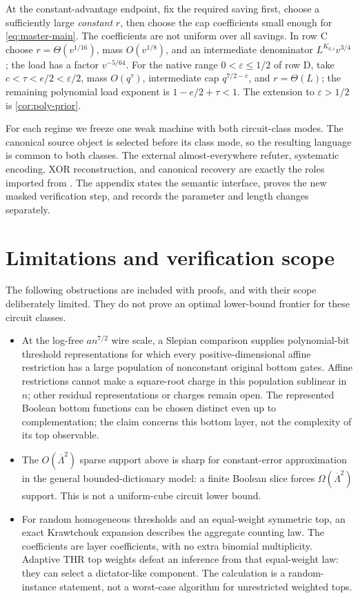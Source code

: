 \documentclass[11pt,letterpaper]{article}
\theoremstyle{definition}
\theoremstyle{remark}
\begin{document}
At the constant-advantage endpoint, fix the required saving first,
choose a sufficiently large \emph{constant} $r$, then choose the cap
coefficients small enough for \cref{eq:master-main}. The coefficients
are not uniform over all savings. In row C choose
$r=\Theta(v^{1/16})$, mass $O(v^{1/8})$, and an intermediate
denominator $L^{K_{0,i}}v^{3/4}$; the load has a factor $v^{-5/64}$.
For the native range $0<\varepsilon\le1/2$ of row D, take
$c<\tau<e/2<\varepsilon/2$, mass $O(q^\tau)$,
intermediate cap $q^{7/2-e}$, and $r=\Theta(L)$; the remaining
polynomial load exponent is $1-e/2+\tau<1$.
The extension to $\varepsilon>1/2$ is \cref{cor:poly-prior}.

For each regime we freeze one weak machine with both circuit-class
modes. The canonical source object is selected before its class mode,
so the resulting language is common to both classes. The external
almost-everywhere refuter, systematic encoding, XOR reconstruction, and
canonical recovery are exactly the roles imported from
\cite{CLW,NagCubic,NagGate}. The appendix states the semantic interface,
proves the new masked verification step, and records the parameter and
length changes separately.

\section{Limitations and verification scope}
\label{sec:limitations-main}

The following obstructions are included with proofs, and with their
scope deliberately limited. They do not prove an optimal lower-bound
frontier for these circuit classes.

\begin{itemize}
\item At the log-free $a n^{7/2}$ wire scale, a Slepian comparison
supplies polynomial-bit threshold representations for which every
positive-dimensional affine restriction has a large population of
nonconstant original bottom gates. Affine restrictions cannot make a
square-root charge in this population sublinear in $n$; other residual
representations or charges remain open. The represented Boolean bottom
functions can be chosen distinct even up to complementation; the claim
concerns this bottom layer, not the complexity of its top observable.
\item The $O(\overline\Lambda^2)$ sparse support above is sharp for
constant-error approximation in the general bounded-dictionary model:
a finite Boolean slice forces $\Omega(\overline\Lambda^2)$ support.
This is not a uniform-cube circuit lower bound.
\item For random homogeneous thresholds and an equal-weight
symmetric top, an exact Krawtchouk expansion describes the aggregate
counting law. The coefficients are layer coefficients, with no extra
binomial multiplicity. Adaptive THR top weights defeat an inference
from that equal-weight law: they can select a dictator-like component.
The calculation is a random-instance statement, not a worst-case
algorithm for unrestricted weighted tops.
\end{itemize}
\end{document}
